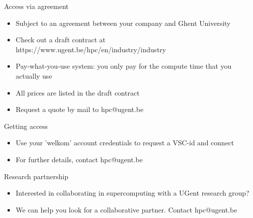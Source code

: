   \item Access via agreement
  \begin{itemize}
    \item Subject to an agreement between your company and Ghent University
    \item Check out a draft contract at https://www.ugent.be/hpc/en/industry/industry
    \item Pay-what-you-use system: you only pay for the compute time that you actually use
    \item All prices are listed in the draft contract
    \item Request a quote by mail to hpc@ugent.be
  \end{itemize}
  \item Getting access
  \begin{itemize}
    \item Use your 'welkom' account credentials to request a VSC-id and connect
    \item For further details, contact hpc@ugent.be
  \end{itemize}
  \item Research partnership
  \begin{itemize}
    \item Interested in collaborating in supercomputing with a UGent research group?
    \item We can help you look for a collaborative partner. Contact hpc@ugent.be
  \end{itemize}

